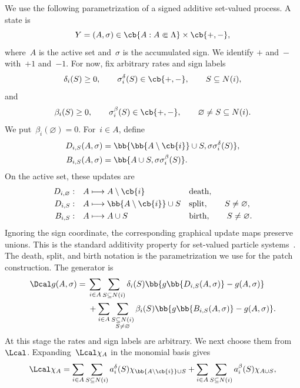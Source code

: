 We use the following parametrization of a signed additive set-valued process. A
state is
\begin{equation*}
Y=(A,\sigma)
\in
\cb{A:A\Subset\Lambda}\times\cb{+,-},
\end{equation*}
where~$A$ is the active set and~$\sigma$ is the accumulated sign. We identify
$+$ and~$-$ with~$+1$ and~$-1$. For now, fix arbitrary rates and sign labels
\begin{equation*}
\delta_i(S)\geq0,
\qquad
\sigma_i^\delta(S)\in\cb{+,-},
\qquad
S\subseteq N(i),
\end{equation*}
and
\begin{equation*}
\beta_i(S)\geq0,
\qquad
\sigma_i^\beta(S)\in\cb{+,-},
\qquad
\varnothing\neq S\subseteq N(i).
\end{equation*}
We put~$\beta_i(\varnothing)=0$. For~$i\in A$, define
\begin{align*}
D_{i,S}(A,\sigma)
&=
\bb{\bb{A\setminus\cb{i}}\cup S,
\sigma\sigma_i^\delta(S)},
\\
B_{i,S}(A,\sigma)
&=
\bb{A\cup S,
\sigma\sigma_i^\beta(S)}.
\end{align*}
On the active set, these updates are
\begin{align*}
D_{i,\varnothing}:&\quad A\longmapsto A\setminus\cb{i}
&&\text{death},
\\
D_{i,S}:&\quad A\longmapsto \bb{A\setminus\cb{i}}\cup S
&&\text{split},\qquad S\neq\varnothing,
\\
B_{i,S}:&\quad A\longmapsto A\cup S
&&\text{birth},\qquad S\neq\varnothing.
\end{align*}
Ignoring the sign coordinate, the corresponding graphical update maps
preserve unions. This is the standard additivity property for set-valued
particle systems~\cite{Harris1978,Griffeath1979,Gray1986}. The death, split,
and birth notation is the parametrization we use for the patch construction.
The generator is
\begin{align*}
\Dcal g(A,\sigma)
={}&
\sum_{i\in A}\sum_{S\subseteq N(i)}
\delta_i(S)
\bb{g\bb{D_{i,S}(A,\sigma)}-g(A,\sigma)}
\\
&+
\sum_{i\in A}
\sum_{\substack{S\subseteq N(i)\\S\neq\varnothing}}
\beta_i(S)
\bb{g\bb{B_{i,S}(A,\sigma)}-g(A,\sigma)}.
\end{align*}
At this stage the rates and sign labels are arbitrary. We next choose them from
$\Lcal$.
Expanding~$\Lcal\chi_A$ in the monomial basis gives
\begin{equation}
\label{eq:signed-dual-generator-expansion}
\Lcal\chi_A
=
\sum_{i\in A}\sum_{S\subseteq N(i)}
a_i^\delta(S)\chi_{\bb{A\setminus\cb{i}}\cup S}
+
\sum_{i\in A}\sum_{S\subseteq N(i)}
a_i^\beta(S)\chi_{A\cup S},
\end{equation}
